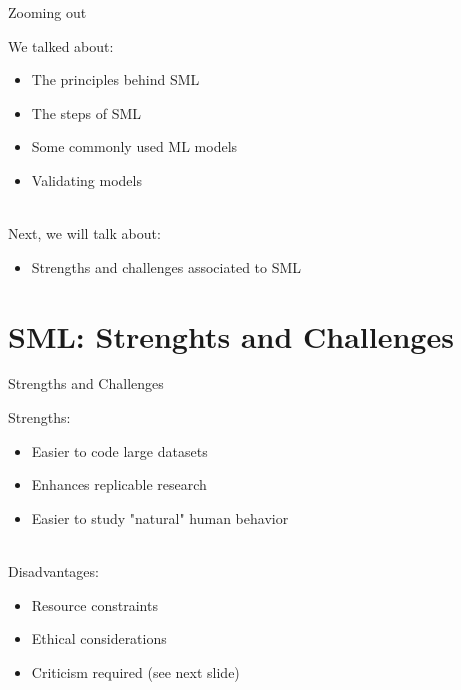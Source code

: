 \documentclass[handout]{beamer}
\begin{document}
\begin{frame}{Zooming out} 
	
	We talked about:
	\begin{itemize}
		\item The principles behind SML
		\item The steps of SML
		\item Some commonly used ML models
		\item Validating models \\\
	\end{itemize}
	
	Next, we will talk about:
	\begin{itemize}
		\item Strengths and challenges associated to SML
	\end{itemize}
	
\end{frame}


\section{SML: Strenghts and Challenges}


\begin{frame}{Strengths and Challenges} 
	
	Strengths:
	\begin{itemize}
		\item Easier to code large datasets
		\item Enhances replicable research
		\item Easier to study "natural" human behavior \\\
	\end{itemize}
	
	Disadvantages:
	\begin{itemize}
		\item Resource constraints
		\item Ethical considerations
		\item Criticism required (see next slide)
	\end{itemize}



\end{frame}
\end{document}
